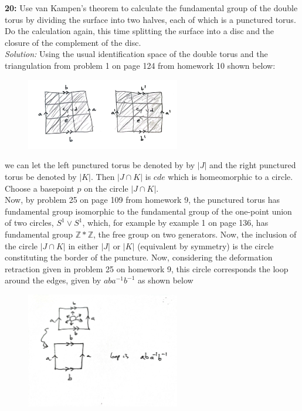 \documentclass[a4paper]{article}
\begin{document}
    \textbf{20:} Use van Kampen's theorem to calculate the fundamental group of
    the double torus by dividing the surface into two halves, each of which is
    a punctured torus. Do the calculation again, this time splitting the
    surface into a disc and the closure of the complement of the disc.\\
    \linebreak
    \textit{Solution:}
    Using the usual identification space of the double torus and the
    triangulation from problem 1 on page 124 from homework 10 shown below:
    \begin{figure}[H]
        \centering
        \includegraphics[width=0.6\textwidth]{1.png}
        \label{fig:1-png}
    \end{figure}
    we can let the left punctured torus be denoted by by $\left| J \right|
    $ and the right punctured torus be denoted by $\left| K \right| $.
    Then $\left| J \cap K \right| $ is $cde$ which is homeomorphic to
    a circle. Choose a basepoint $p$ on the circle
    $\left| J \cap K \right| $.\\
    Now, by problem 25 on page 109 from homework 9, the punctured torus has
    fundamental group isomorphic to the fundamental group of the one-point
    union of two circles, $S^{1} \vee S^{1}$, which, for example by example
    1 on page 136, has fundamental group $\mathbb{Z} * \mathbb{Z}$, the free
      group on two generators. Now, the inclusion of the circle
      $\left| J \cap K \right| $ in either  $\left| J \right| $ or $\left| K \right| $ 
      (equivalent by symmetry) is the circle constituting the border of the
      puncture. Now, considering the deformation retraction given in problem 25
      on homework 9, this circle corresponds the loop around the edges, given
      by
      $ab a^{-1}b^{-1}$ as shown below
      \begin{figure}[H]
          \centering
          \includegraphics[width=0.6\textwidth]{12.jpeg}
          \label{fig:12-png}
      \end{figure}
\end{document}
